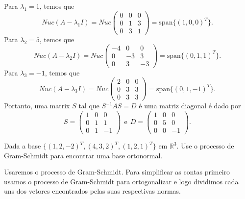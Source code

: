 \documentclass[11pt]{exam}
\begin{document}
\begin{questions}
\begin{parts}
\begin{solution}
       Para $\lambda_{1}=1$, temos que 
       $$
       Nuc(A-\lambda_1I)=Nuc \begin{pmatrix}
                              0 & 0 &0 \\
                              0 & 1 & 3 \\
                              0 & 3 & 1
                             \end{pmatrix}=\text{span}\{(1, 0, 0)^{T}\}.
       $$
       Para $\lambda_{2}=5$, temos que 
       $$
       Nuc(A-\lambda_2I)=Nuc \begin{pmatrix}
                              -4 & 0 &0 \\
                              0 & -3 & 3 \\
                              0 & 3 & -3
                             \end{pmatrix}=\text{span}\{(0, 1, 1)^{T}\}.                           
       $$
       Para $\lambda_{3}=-1$, temos que 
       $$
       Nuc(A-\lambda_3I)=Nuc \begin{pmatrix}
                              2 & 0 &0 \\
                              0 & 3 & 3 \\
                              0 & 3 & 3
                             \end{pmatrix}=\text{span}\{(0, 1, -1)^{T}\}.                           
       $$
       Portanto, uma matrix $S$ tal que $S^{-1}AS=D$ é uma matriz diagonal é dado por 
       $$
       S=
       \begin{pmatrix}
       1 & 0 &  0 \\
       0 & 1 &  1 \\
       0 & 1 & -1
       \end{pmatrix} \ \ \text{e} \ \ 
       D=
       \begin{pmatrix}
       1 & 0 & 0 \\
       0 & 5 & 0 \\
       0 & 0 & -1
       \end{pmatrix}.                   
       $$
      \end{solution}
    \end{parts}
  
  \question[20] 
  Dada a base 
 $\{(1,2,-2)^{T},(4,3,2)^{T},(1,2,1)^{T}\}$ 
 em $\mathbb{R}^{3}$.
 Use o processo de Gram-Schmidt para encontrar uma base 
 ortonormal. 
    \begin{solution}
     Usaremos o processo de Gram-Schmidt. Para simplificar as contas primeiro
     usamos o processo de Gram-Schmidt para ortogonalizar e logo dividimos cada uns dos vetores encontrados 
     pelas suas respectivas normas.
     

\end{solution}
\end{questions}
\end{document}
